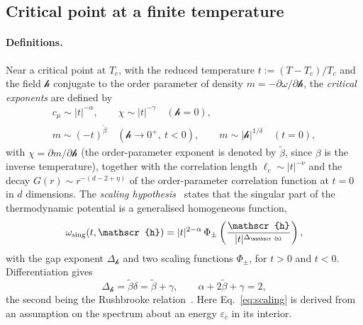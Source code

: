 \documentclass[10pt,a4paper]{article}
\theoremstyle{plain}
\newcommand{\hfield}{\mathscr{h}}  %
\begin{document}
\subsection{Critical point at a finite temperature}
\label{sec:filt_critical}

\paragraph{Definitions.} Near a critical point at $T_c$, with the reduced
temperature $t:=(T-T_c)/T_c$ and the field $\hfield$ conjugate to the order
parameter of density $m=-\partial\omega/\partial\hfield$, the \emph{critical
exponents} are defined by
\begin{equation}\label{eq:exponents}
\begin{gathered}
  c_\mu\sim|t|^{-\alpha},\qquad
  \chi\sim|t|^{-\gamma}\quad(\hfield=0),
  \\
  m\sim(-t)^{\tilde\beta}\quad(\hfield\to0^{+},\ t<0),\qquad
  m\sim|\hfield|^{1/\delta}\quad(t=0),
\end{gathered}
\end{equation}
with $\chi=\partial m/\partial \hfield$ (the order-parameter exponent is
denoted by $\tilde\beta$, since $\beta$ is the inverse temperature),
together with the correlation length $\ell_c\sim|t|^{-\nu}$ and the decay
$G(r)\sim r^{-(d-2+\eta)}$ of the order-parameter correlation function at
$t=0$ in $d$ dimensions. The \emph{scaling hypothesis}~\cite{Widom1965}
states that the singular part of the thermodynamic potential is a
generalised homogeneous function,
\begin{equation}\label{eq:scaling}
  \omega_{\rm sing}(t,\hfield)=|t|^{2-\alpha}\,\Phi_\pm\left(\frac{\hfield}{|t|^{\Delta_\hfield}}\right) ,
\end{equation}
with the gap exponent $\Delta_\hfield$ and two scaling functions $\Phi_\pm$,
for $t>0$ and $t<0$. Differentiation gives
\begin{equation}\label{eq:rushbrooke}
  \Delta_\hfield=\tilde\beta\delta=\tilde\beta+\gamma ,\qquad \alpha+2\tilde\beta+\gamma=2 ,
\end{equation}
the second being the Rushbrooke relation~\cite[Ch.~7]{Schwabl}. Here
Eq.~\eqref{eq:scaling} is derived from an assumption on the spectrum about
an energy $\varepsilon_c$ in its interior.
\end{document}

